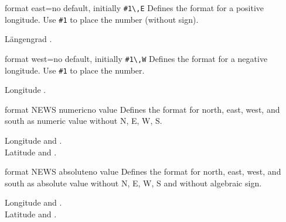 \pagebreak
\begin{docMrcKey}{format east}{=}{no default, initially \texttt{\#1\textbackslash,E}}
  Defines the format  for a positive longitude.
  Use \texttt{\#1} to place the number (without sign).
  \begin{dispExample}
    L\"angengrad .
  \end{dispExample}
\end{docMrcKey}

\begin{docMrcKey}{format west}{=}{no default, initially \texttt{\#1\textbackslash,W}}
  Defines the format  for a negative longitude.
  Use \texttt{\#1} to place the number.
  \begin{dispExample}
    Longitude .
  \end{dispExample}
\end{docMrcKey}


\begin{docMrcKey}{format NEWS numeric}{}{no value}
  Defines the format for north, east, west, and south as numeric value
  without N, E, W, S.
  \begin{dispExample}
    Longitude  and .\\
    Latitude   and .
  \end{dispExample}
\end{docMrcKey}


\begin{docMrcKey}{format NEWS absolute}{}{no value}
  Defines the format for north, east, west, and south as absolute value
  without N, E, W, S and without algebraic sign.
  \begin{dispExample}
    Longitude  and .\\
    Latitude   and .
  \end{dispExample}
\end{docMrcKey}

